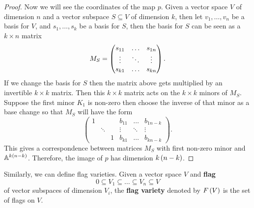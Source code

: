 \begin{proof}
Now we will see the coordinates of the map $ p $. Given a vector space $ V $ of dimension $ n $ and a vector subspace $ S \subseteq V $ of dimension $ k $, then let $ v_1, \dots, v_n $ be a basis for $ V $, and $ s_1, \dots, s_k $ be a basis for $ S $, then the basis for $ S $ can be seen as a $ k \times n $ matrix
$$ M_S = \threebythree{s_{11}}{\dots}{s_{1n}}{\vdots}{\ddots}{\vdots}{s_{k1}}{\dots}{s_{kn}}. $$
If we change the basis for $ S $ then the matrix above gets multiplied by an invertible $ k \times k $ matrix. Then this $ k \times k $ matrix acts on the $ k \times k $ minors of $ M_S $. Suppose the first minor $ K_1 $ is non-zero then choose the inverse of that minor as a base change so that $ M_S $ will have the form
$$
\begin{pmatrix}
1 & & & b_{11} & \dots & b_{1n - k} \\
& \ddots & & \vdots & \ddots & \vdots \\
& & 1 & b_{k1} & \dots & b_{kn - k}
\end{pmatrix}.
$$
This gives a correspondence between matrices $ M_S $ with first non-zero minor and $ \mathbb{A}^{k\left( n - k \right)} $. Therefore, the image of $ p $ has dimension $ k\left( n - k \right) $.
\end{proof}

Similarly, we can define flag varieties. Given a vector space $ V $ and \textbf{flag}
$$ 0 \subseteq V_1 \subseteq \dots \subseteq V_n \subseteq V $$
of vector subspaces of dimension $ V_i $, the \textbf{flag variety} denoted by $ F\left( V \right) $ is the set of flags on $ V $.

